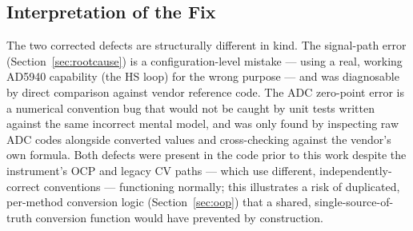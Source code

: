 \documentclass[preprint,12pt]{elsarticle}
\begin{document}
\subsection{Interpretation of the Fix}
The two corrected defects are structurally different in kind. The signal-path error (Section~\ref{sec:rootcause}) is a configuration-level mistake --- using a real, working AD5940 capability (the HS loop) for the wrong purpose --- and was diagnosable by direct comparison against vendor reference code. The ADC zero-point error is a numerical convention bug that would not be caught by unit tests written against the same incorrect mental model, and was only found by inspecting raw ADC codes alongside converted values and cross-checking against the vendor's own formula. Both defects were present in the code prior to this work despite the instrument's OCP and legacy CV paths --- which use different, independently-correct conventions --- functioning normally; this illustrates a risk of duplicated, per-method conversion logic (Section~\ref{sec:oop}) that a shared, single-source-of-truth conversion function would have prevented by construction.
\end{document}
